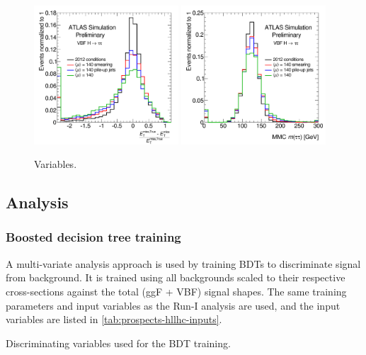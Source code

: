 \begin{figure}[!htpb]
  \centering
  \includegraphics[width=0.48\textwidth]{figures/ATL-PHYS-PUB-2014-018/fig_01a}
  \includegraphics[width=0.48\textwidth]{figures/ATL-PHYS-PUB-2014-018/fig_01b}
  \caption{Variables.}
  \label{fig:prospects-hllhc-degradation}
\end{figure}

\subsection{Analysis}

\subsubsection{Boosted decision tree training}

A multi-variate analysis approach is used by training BDTs to discriminate signal from background. It is trained using all backgrounds scaled to their respective cross-sections against the total (ggF + VBF) signal shapes. The same training parameters and input variables as the Run-I analysis are used, and the input variables are listed in \cref{tab:prospects-hllhc-inputs}.

\begin{table}[!htpb]
  \centering
  \renewcommand{\arraystretch}{1.4}
  \caption{Discriminating variables used for the BDT training.}
  
  \label{tab:prospects-hllhc-inputs}
\end{table}

